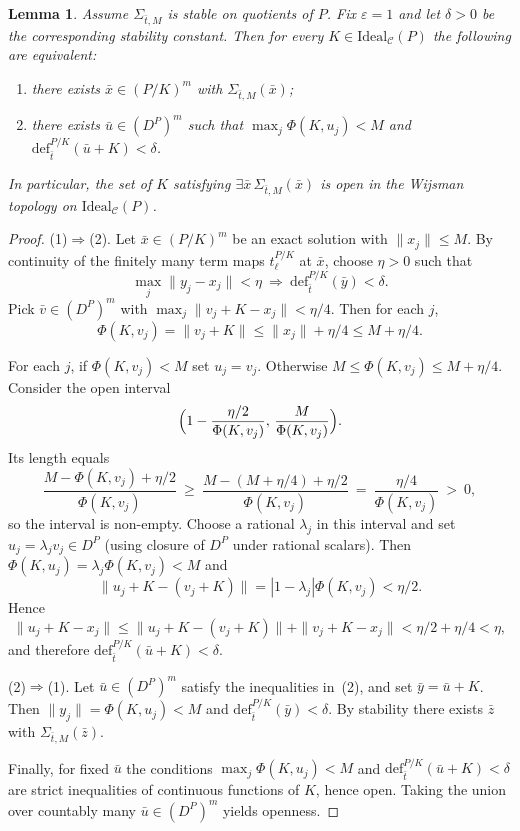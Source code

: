 \documentclass[12pt,fleqn,a4paper]{amsart}
\renewcommand{\le}{\leqslant}
\renewcommand{\ge}{\geqslant}
\numberwithin{equation}{section}
\newtheorem{lemma}[theorem]{Lemma}
\theoremstyle{definition}
\newcommand{\Ideal}{\mathrm{Ideal}}
\begin{document}
\begin{lemma}\label{lem:stable-exists-dense}
Assume $\Sigma_{\bar t,M}$ is stable on quotients of $P$.
Fix $\varepsilon=1$ and let $\delta>0$ be the corresponding stability constant.
Then for every $K\in\Ideal_{\mathcal C}(P)$ the following are equivalent:
\begin{enumerate}
\item there exists $\bar x\in (P/K)^m$ with $\Sigma_{\bar t,M}(\bar x)$;
\item there exists $\bar u\in (D^P)^m$ such that
$\max_j\Phi(K,u_j)< M$ and $\mathrm{def}_{\bar t}^{P/K}(\bar u+K)<\delta$.
\end{enumerate}
In particular, the set of $K$ satisfying $\exists\bar x\,\Sigma_{\bar t,M}(\bar x)$
is \emph{open} in the Wijsman topology on $\Ideal_{\mathcal C}(P)$.
\end{lemma}

\begin{proof}
(1)$\Rightarrow$(2).
Let $\bar x\in (P/K)^m$ be an exact solution with $\|x_j\|\le M$.
By continuity of the finitely many term maps $t_\ell^{P/K}$ at $\bar x$,
choose $\eta>0$ such that
\[
\max_j\|y_j-x_j\|<\eta \ \Longrightarrow\ 
\mathrm{def}_{\bar t}^{P/K}(\bar y)<\delta.
\]
Pick $\bar v\in(D^P)^m$ with $\max_j\|v_j+K-x_j\|<\eta/4$.
Then for each $j$,
\[
\Phi(K,v_j)=\|v_j+K\|\le \|x_j\|+\eta/4\le M+\eta/4.
\]

For each $j$, if $\Phi(K,v_j)<M$ set $u_j=v_j$.
Otherwise $M\le \Phi(K,v_j)\le M+\eta/4$.
Consider the open interval
\[
\Bigl(1-\frac{\eta/2}{\Phi(K,v_j)},\,\frac{M}{\Phi(K,v_j)}\Bigr).
\]
Its length equals
\[
\frac{M-\Phi(K,v_j)+\eta/2}{\Phi(K,v_j)}
\ \ge\ \frac{M-(M+\eta/4)+\eta/2}{\Phi(K,v_j)}
\ =\ \frac{\eta/4}{\Phi(K,v_j)}\ >\ 0,
\]
so the interval is non-empty. Choose a rational $\lambda_j$ in this interval and set
$u_j=\lambda_j v_j\in D^P$ (using closure of $D^P$ under rational scalars).
Then $\Phi(K,u_j)=\lambda_j\Phi(K,v_j)<M$ and
\[
\|u_j+K-(v_j+K)\|=|1-\lambda_j|\Phi(K,v_j)<\eta/2.
\]
Hence
\[
\|u_j+K-x_j\|\le \|u_j+K-(v_j+K)\|+\|v_j+K-x_j\|
<\eta/2+\eta/4<\eta,
\]
and therefore $\mathrm{def}_{\bar t}^{P/K}(\bar u+K)<\delta$.

(2)$\Rightarrow$(1).
Let $\bar u\in(D^P)^m$ satisfy the inequalities in~(2), and set $\bar y=\bar u+K$.
Then $\|y_j\|=\Phi(K,u_j)<M$ and $\mathrm{def}_{\bar t}^{P/K}(\bar y)<\delta$.
By stability there exists $\bar z$ with $\Sigma_{\bar t,M}(\bar z)$.

Finally, for fixed $\bar u$ the conditions
$\max_j\Phi(K,u_j)<M$ and $\mathrm{def}_{\bar t}^{P/K}(\bar u+K)<\delta$
are strict inequalities of continuous functions of $K$, hence open.
Taking the union over countably many $\bar u\in(D^P)^m$ yields openness.
\end{proof}
\end{document}
